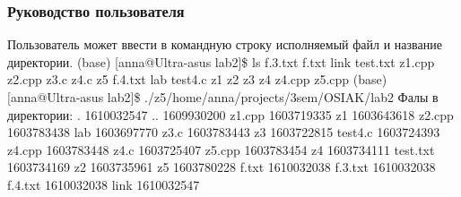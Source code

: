 \documentclass[a4paper,12pt]{extarticle}
\begin{document}
\subsubsection{Руководство пользователя}
Пользователь может ввести в командную строку исполняемый файл и название директории.\newline
(base) [anna@Ultra-asus lab2]\$ ls\newline
f.3.txt  f.txt  link     test.txt  z1.cpp  z2.cpp  z3.c  z4.c    z5\newline
f.4.txt  lab    test4.c  z1        z2      z3      z4    z4.cpp \newline z5.cpp\newline
(base) [anna@Ultra-asus lab2]\$ ./z5\newline /home/anna/projects/3sem/OSIAK/lab2\newline
Фалы в директории:\newline
. 1610032547\newline
.. 1609930200\newline
z1.cpp 1603719335\newline
z1 1603643618\newline
z2.cpp 1603783438\newline
lab 1603697770\newline
z3.c 1603783443\newline
z3 1603722815\newline
test4.c 1603724393\newline
z4.cpp 1603783448\newline
z4.c 1603725407\newline
z5.cpp 1603783454\newline
z4 1603734111\newline
test.txt 1603734169\newline
z2 1603735961\newline
z5 1603780228\newline
f.txt 1610032038\newline
f.3.txt 1610032038\newline
f.4.txt 1610032038\newline
link 1610032547\newline
\end{document}
